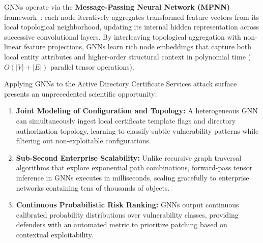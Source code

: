 GNNs operate via the \textbf{Message-Passing Neural Network (MPNN)} framework~\cite{gilmer2017neural}: each node iteratively aggregates transformed feature vectors from its local topological neighborhood, updating its internal hidden representation across successive convolutional layers. By interleaving topological aggregation with non-linear feature projections, GNNs learn rich node embeddings that capture both local entity attributes and higher-order structural context in polynomial time ($O(|V| + |E|)$ parallel tensor operations).

Applying GNNs to the Active Directory Certificate Services attack surface presents an unprecedented scientific opportunity:
\begin{enumerate}
    \item \textbf{Joint Modeling of Configuration and Topology:} A heterogeneous GNN can simultaneously ingest local certificate template flags and directory authorization topology, learning to classify subtle vulnerability patterns while filtering out non-exploitable configurations.
    \item \textbf{Sub-Second Enterprise Scalability:} Unlike recursive graph traversal algorithms that explore exponential path combinations, forward-pass tensor inference in GNNs executes in milliseconds, scaling gracefully to enterprise networks containing tens of thousands of objects.
    \item \textbf{Continuous Probabilistic Risk Ranking:} GNNs output continuous calibrated probability distributions over vulnerability classes, providing defenders with an automated metric to prioritize patching based on contextual exploitability.
\end{enumerate}

